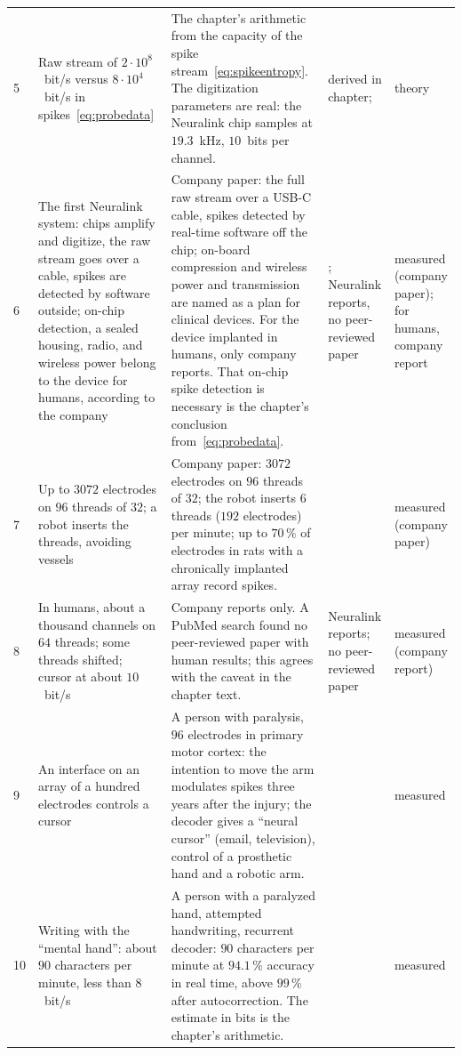 {\begin{longtable}{>{\raggedright}p{0.5cm}>{\raggedright}p{4.0cm}>{\raggedright}p{5.6cm}>{\raggedright}p{2.3cm}>{\raggedright\arraybackslash}p{1.7cm}}
5 & Raw stream of $2\cdot10^8$~bit/s versus $8\cdot10^4$~bit/s in spikes~\eqref{eq:probedata} & The chapter's arithmetic from the capacity of the spike stream~\eqref{eq:spikeentropy}. The digitization parameters are real: the Neuralink chip samples at $19.3$~kHz, $10$~bits per channel. & derived in chapter; \cite{Rieke1997, Musk2019} & theory \\
6 & The first Neuralink system: chips amplify and digitize, the raw stream goes over a cable, spikes are detected by software outside; on-chip detection, a sealed housing, radio, and wireless power belong to the device for humans, according to the company & Company paper: the full raw stream over a USB-C cable, spikes detected by real-time software off the chip; on-board compression and wireless power and transmission are named as a plan for clinical devices. For the device implanted in humans, only company reports. That on-chip spike detection is necessary is the chapter's conclusion from~\eqref{eq:probedata}. & \cite{Musk2019}; Neuralink reports, no peer-reviewed paper & measured (company paper); for humans, company report \\
7 & Up to $3072$ electrodes on $96$ threads of $32$; a robot inserts the threads, avoiding vessels & Company paper: $3072$ electrodes on $96$ threads of $32$; the robot inserts $6$ threads ($192$ electrodes) per minute; up to $70\,\%$ of electrodes in rats with a chronically implanted array record spikes. & \cite{Musk2019} & measured (company paper) \\
8 & In humans, about a thousand channels on $64$ threads; some threads shifted; cursor at about $10$~bit/s & Company reports only. A PubMed search found no peer-reviewed paper with human results; this agrees with the caveat in the chapter text. & Neuralink reports; no peer-reviewed paper & measured (company report) \\
9 & An interface on an array of a hundred electrodes controls a cursor & A person with paralysis, $96$ electrodes in primary motor cortex: the intention to move the arm modulates spikes three years after the injury; the decoder gives a ``neural cursor'' (email, television), control of a prosthetic hand and a robotic arm. & \cite{Hochberg2006} & measured \\
10 & Writing with the ``mental hand'': about $90$ characters per minute, less than $8$~bit/s & A person with a paralyzed hand, attempted handwriting, recurrent decoder: $90$ characters per minute at $94.1\,\%$ accuracy in real time, above $99\,\%$ after autocorrection. The estimate in bits is the chapter's arithmetic. & \cite{Willett2021} & measured \\

\end{longtable}}
